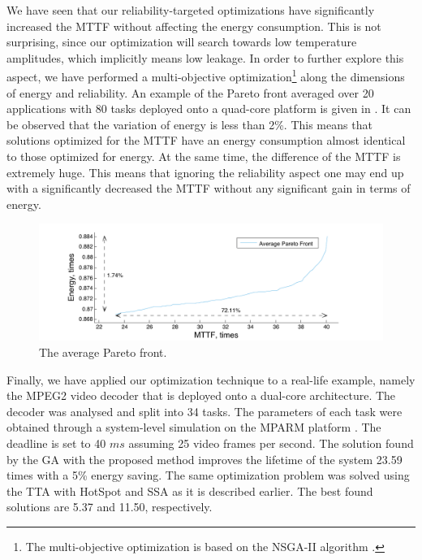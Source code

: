 We have seen that our reliability-targeted optimizations have significantly increased the MTTF without affecting the energy consumption. This is not surprising, since our optimization will search towards low temperature amplitudes, which implicitly means low leakage. In order to further explore this aspect, we have performed a multi-objective optimization\footnote{The multi-objective optimization is based on the NSGA-II algorithm \cite{deb2002}.} along the dimensions of energy and reliability. An example of the Pareto front averaged over 20 applications with 80 tasks deployed onto a quad-core platform is given in . It can be observed that the variation of energy is less than 2\%. This means that solutions optimized for the MTTF have an energy consumption almost identical to those optimized for energy. At the same time, the difference of the MTTF is extremely huge. This means that ignoring the reliability aspect one may end up with a significantly decreased the MTTF without any significant gain in terms of energy.
\begin{figure}[b]
  \centering
  \includegraphics[width=1.0\linewidth]{assets/average-pareto.pdf}
  \caption{The average Pareto front.}
  \label{fig:average-pareto}
\end{figure}

Finally, we have applied our optimization technique to a real-life example, namely the MPEG2 video decoder \cite{ffmpeg2011} that is deployed onto a dual-core architecture. The decoder was analysed and split into 34 tasks. The parameters of each task were obtained through a system-level simulation on the MPARM platform \cite{benini2005}. The deadline is set to 40 $ms$ assuming 25 video frames per second. The solution found by the GA with the proposed method improves the lifetime of the system 23.59 times with a 5\% energy saving. The same optimization problem was solved using the TTA with HotSpot and SSA as it is described earlier. The best found solutions are 5.37 and 11.50, respectively.
